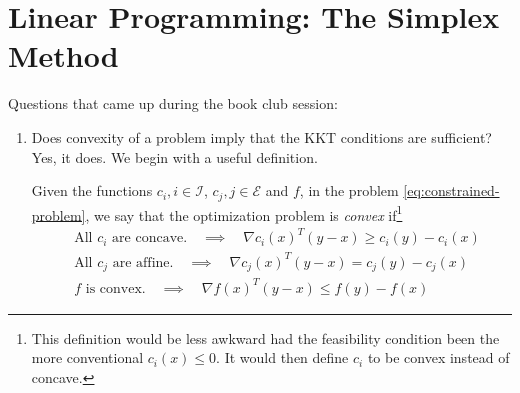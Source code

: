 \newpage
\section{Linear Programming: The Simplex Method}

Questions that came up during the book club session:
\begin{enumerate}
    \item Does convexity of a problem imply that the KKT conditions are sufficient?
          Yes, it does.
          We begin with a useful definition.
          \begin{Def}
              Given the functions $c_i, i \in \mathcal{I}$, $c_j, j \in \mathcal{E}$ and $f$, in the problem \eqref{eq:constrained-problem}, we say that the optimization problem is \textit{convex} if\footnote{
                  This definition would be less awkward had the feasibility condition been the more conventional $c_i(x) \leq 0$. It would then define $c_i$ to be convex instead of concave.
              }
              \begin{align*}
                   & \text{All }c_i\text{ are concave.}\quad \implies \quad \nabla c_i(x)^T(y - x) \geq c_i(y) - c_i(x) \\
                   & \text{All }c_j\text{ are affine.}\quad \implies \quad \nabla c_j(x)^T(y - x) = c_j(y) - c_j(x)     \\
                   & f\text{ is convex.}\quad \implies \quad \nabla f(x)^T(y - x) \leq f(y) - f(x)
              \end{align*}
              \label{def:convex-problem}
          \end{Def}


\end{enumerate}

